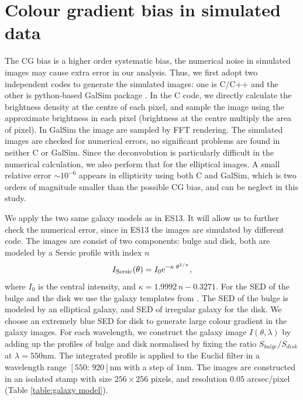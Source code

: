 \documentclass[useAMS,usenatbib]{mn2e}
\newcommand{\be}{\begin{equation}}
\newcommand{\ee}{\end{equation}}
\begin{document}
\section{Colour gradient bias in simulated data}

The CG bias is a higher order systematic bias, the numerical noise in
simulated images may cause extra error in our analysis. Thus, we first
adopt two independent codes to generate the simulated images: one is C/C++
and the other is python-based GalSim package
\citep{2015A&amp;C....10..121R}. In the C code, we directly calculate
the brightness density at the centre of each pixel, and sample the
image using the approximate brightness in each pixel (brightness at
the centre multiply the area of pixel). In GalSim the image are sampled
by FFT rendering.
%
The simulated images are checked for numerical errors, no significant
problems are found in neither C or GalSim. Since the deconvolution is
particularly difficult in the numerical calculation, we also perform
that for the elliptical images. A small relative error $\sim10^{-6}$
appears in ellipticity using both C and GalSim, which is two orders of
magnitude smaller than the possible CG bias, and can be neglect in
this study.

We apply the two same galaxy models as in ES13. It will allow us to
further check the numerical error, since in ES13 the images are
simulated by different code. The images are consist of two components:
bulge and disk, both are modeled by a Sersic profile with index $n$
%
\be
I_{\rm Sersic}(\theta) = I_0 {\rm e}^{-\kappa\; \theta^{1/n}},
\ee
%
where $I_0$ is the central intensity, and $\kappa=1.9992\,n -
0.3271$.  For the SED of the bulge and the disk we use the galaxy
templates from \citet{1980ApJS...43..393C}. The SED of the bulge is
modeled by an elliptical galaxy, and SED of irregular galaxy for the
disk. We choose an extremely blue SED for disk to generate large
colour gradient in the galaxy images. For each wavelength, we
construct the galaxy image $I(\theta,\lambda)$ by adding up the
profiles of bulge and disk normalised by fixing the ratio
$S_{bulge}/S_{disk}$ at $\lambda=550$nm. The integrated profile is
applied to the Euclid filter in a wavelength range $[550:\,920]$nm
with a step of $1$nm. The images are constructed in an isolated stamp
with size $256\times256$ pixels, and resolution $0.05$ arcsec/pixel
(Table \ref{table:galaxy model}).
\end{document}
